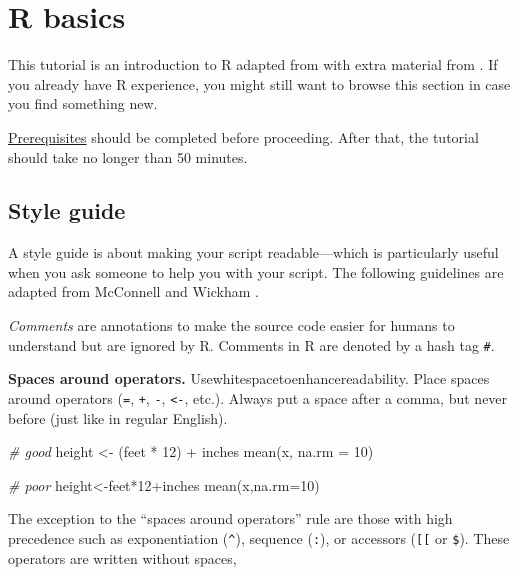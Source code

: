 \documentclass[
]{book}
\newenvironment{Shaded}{\begin{snugshade}}{\end{snugshade}}
\newcommand{\AttributeTok}[1]{\textcolor[rgb]{0.77,0.63,0.00}{#1}}
\newcommand{\CommentTok}[1]{\textcolor[rgb]{0.56,0.35,0.01}{\textit{#1}}}
\newcommand{\DecValTok}[1]{\textcolor[rgb]{0.00,0.00,0.81}{#1}}
\newcommand{\FunctionTok}[1]{\textcolor[rgb]{0.00,0.00,0.00}{#1}}
\newcommand{\NormalTok}[1]{#1}
\newcommand{\OtherTok}[1]{\textcolor[rgb]{0.56,0.35,0.01}{#1}}
\newcommand{\SpecialCharTok}[1]{\textcolor[rgb]{0.00,0.00,0.00}{#1}}
\begin{document}
\hypertarget{r-basics}{%
\section{R basics}\label{r-basics}}

This tutorial is an introduction to R adapted from \citep{Healy:2019:Ch.2} with extra material from \citep{Matloff:2019}. If you already have R experience, you might still want to browse this section in case you find something new.

\protect\hyperlink{prerequisites}{Prerequisites} should be completed before proceeding. After that, the tutorial should take no longer than 50 minutes.

\hypertarget{style-guide}{%
\subsection{Style guide}\label{style-guide}}

A style guide is about making your script readable---which is particularly useful when you ask someone to help you with your script. The following guidelines are adapted from McConnell \citeyearpar{McConnell:2004} and Wickham \citeyearpar{Wickham:2019:styleguide}.

\emph{Comments} are annotations to make the source code easier for humans to understand but are ignored by R. Comments in R are denoted by a hash tag \texttt{\#}.

\textbf{Spaces around operators.} Usewhitespacetoenhancereadability. Place spaces around operators (\texttt{=}, \texttt{+}, \texttt{-}, \texttt{\textless{}-}, etc.). Always put a space after a comma, but never before (just like in regular English).

\begin{Shaded}
\begin{Highlighting}[]
\CommentTok{\# good}
\NormalTok{height }\OtherTok{\textless{}{-}}\NormalTok{ (feet }\SpecialCharTok{*} \DecValTok{12}\NormalTok{) }\SpecialCharTok{+}\NormalTok{ inches}
\FunctionTok{mean}\NormalTok{(x, }\AttributeTok{na.rm =} \DecValTok{10}\NormalTok{)}

\CommentTok{\# poor}
\NormalTok{height}\OtherTok{\textless{}{-}}\NormalTok{feet}\SpecialCharTok{*}\DecValTok{12}\SpecialCharTok{+}\NormalTok{inches}
\FunctionTok{mean}\NormalTok{(x,}\AttributeTok{na.rm=}\DecValTok{10}\NormalTok{)}
\end{Highlighting}
\end{Shaded}

The exception to the ``spaces around operators'' rule are those with high precedence such as exponentiation (\texttt{\^{}}), sequence (\texttt{:}), or accessors (\texttt{{[}{[}} or \texttt{\$}). These operators are written without spaces,
\end{document}
